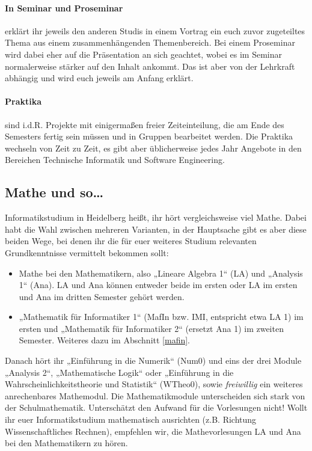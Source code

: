 \paragraph*{In Seminar und Proseminar} erklärt ihr jeweils den anderen Studis in einem Vortrag ein euch zuvor zugeteiltes Thema aus einem zusammenhängenden Themenbereich. Bei einem Proseminar wird dabei eher auf die Präsentation an sich geachtet, wobei es im Seminar normalerweise stärker auf den Inhalt ankommt. Das ist aber von der Lehrkraft abhängig und wird euch jeweils am Anfang erklärt.

\paragraph*{Praktika} sind i.d.R. Projekte mit einigermaßen freier Zeiteinteilung, die am Ende des Semesters fertig sein müssen und in Gruppen bearbeitet werden. Die Praktika wechseln von Zeit zu Zeit, es gibt aber üblicherweise jedes Jahr Angebote in den Bereichen Technische Informatik und Software Engineering.

\subsection{Mathe und so\dots}

Informatikstudium in Heidelberg heißt, ihr hört vergleichsweise viel Mathe. Dabei habt die Wahl zwischen mehreren Varianten, in der Hauptsache gibt es aber diese beiden Wege, bei denen ihr die für euer weiteres Studium relevanten Grundkenntnisse vermittelt bekommen sollt:

\begin{itemize}
	\item Mathe bei den Mathematikern, also „Lineare Algebra 1“ (\gls{LA}) und „Analysis 1“ (\gls{Ana}). LA und Ana können entweder beide im ersten oder LA im ersten und Ana im dritten Semester gehört werden.
	\item „Mathematik für Informatiker 1“ (\gls{MafIn} bzw. IMI, entspricht etwa LA 1) im ersten und „Mathematik für Informatiker 2“ (ersetzt Ana 1) im zweiten Semester. Weiteres dazu im Abschnitt \autoref{mafin}.
\end{itemize}

Danach hört ihr „Einführung in die Numerik“ (\gls{Num0}) und eins der drei Module „Analysis 2“, „Mathematische Logik“ oder „Einführung in die Wahrscheinlichkeitstheorie und Statistik“ (\gls{WTheo0}), sowie \emph{freiwillig} ein weiteres anrechenbares Mathemodul. Die Mathematikmodule unterscheiden sich stark von der Schulmathematik. Unterschätzt den Aufwand für die Vorlesungen nicht! Wollt ihr euer Informatikstudium mathematisch ausrichten (z.B. Richtung Wissenschaftliches Rechnen), empfehlen wir, die Mathevorlesungen LA und Ana bei den Mathematikern zu hören.

